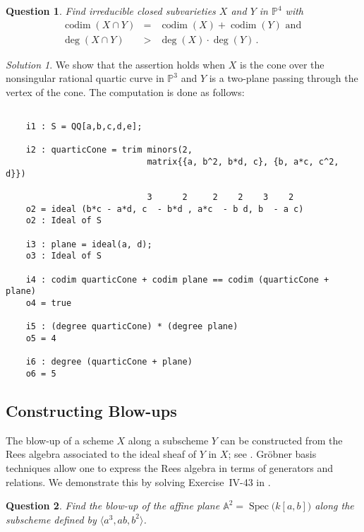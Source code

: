 \documentclass[12pt,noamsfonts]{amsart}
\def\AA{{\mathbb A}}
\def\PP{{\mathbb P}}
\newcommand{\Spec}{\operatorname{Spec}}
\newcommand{\codim}{\operatorname{codim}}
\newtheorem{question}{Question}
\theoremstyle{definition}
\theoremstyle{remark}
\newtheorem*{solution}{Solution}
\begin{document}
\begin{question}
Find irreducible closed subvarieties $X$ and $Y$ in $\PP^{4}$ with
\begin{eqnarray*}
\codim(X \cap Y) & = & \codim(X) +\codim(Y) \text{ and }\\
\deg(X \cap Y) & > & \deg(X) \cdot \deg(Y) \, .
\end{eqnarray*}
\end{question}

\begin{solution}
We show that the assertion holds when $X$ is the cone over the
nonsingular rational quartic curve in $\PP^{3}$ and $Y$ is a two-plane
passing through the vertex of the cone.
The computation is done as follows:
{\scriptsize
\begin{verbatim}

    i1 : S = QQ[a,b,c,d,e];
    
    i2 : quarticCone = trim minors(2, 
                            matrix{{a, b^2, b*d, c}, {b, a*c, c^2, d}})
              
                            3      2     2    2    3    2
    o2 = ideal (b*c - a*d, c  - b*d , a*c  - b d, b  - a c)
    o2 : Ideal of S
    
    i3 : plane = ideal(a, d);
    o3 : Ideal of S
    
    i4 : codim quarticCone + codim plane == codim (quarticCone + plane)
    o4 = true
    
    i5 : (degree quarticCone) * (degree plane)
    o5 = 4
    
    i6 : degree (quarticCone + plane)
    o6 = 5

\end{verbatim}}
\end{solution}

\subsection*{Constructing Blow-ups}

The blow-up of a scheme $X$ along a subscheme $Y$ can be constructed
from the Rees algebra associated to the ideal sheaf of $Y$ in $X$; 
see \cite[Theorem IV-22]{EH}.  Gr\"{o}bner basis
techniques allow one to express the Rees algebra in terms of 
generators and relations.  We demonstrate this 
by solving Exercise~IV-43 in \cite{EH}.

\begin{question}
Find the blow-up of the affine plane $\AA^{2} = \Spec\big( k[a,b]
\big)$ along the subscheme defined by $\langle a^{3}, ab, b^{2}
\rangle$.
\end{question}
\end{document}
